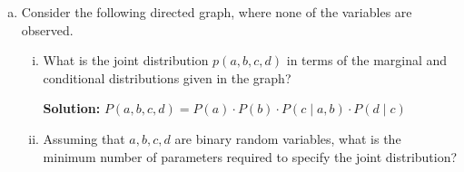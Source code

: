 \documentclass{article}
\newenvironment{solution}{\color{blue} \smallskip \textbf{Solution:}}{}
\begin{document}
\begin{enumerate}[(a)]
\begin{enumerate}[(i)]
        \begin{solution}
            G1
        \end{solution}

        \item 
        A country's economic stability (\(c\)) affects both employment rates (\(a\)) and consumer spending habits (\(b\)).

        \begin{solution}
            G2
        \end{solution}

        \item 
        A restaurant’s popularity (\(c\)) hinges on both the quality of its food (\(a\)) and its social media presence (\(b\)).

        \begin{solution}
            G3
        \end{solution}
    \end{enumerate}

    \newpage
    \item 
    Consider the following directed graph, where none of the variables are observed. 

    \begin{figure}[h]
        \centering
    \end{figure}

    \begin{enumerate}[(i)]
        \item 
        What is the joint distribution $p(a, b, c, d)$ in terms of the marginal and conditional distributions given in the graph?

        \begin{solution}
$P(a, b, c, d) = P(a) \cdot P(b) \cdot P(c \mid a, b) \cdot P(d \mid c)$
        \end{solution}

        \item 
        Assuming that $a, b, c, d$ are binary random variables, what is the minimum number of parameters required to specify the joint distribution?


\end{enumerate}
\end{enumerate}
\end{document}
